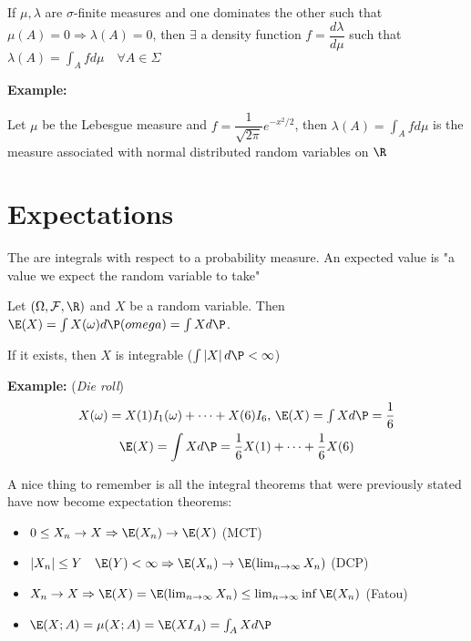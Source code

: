 \par\bigskip
\begin{theo}{}
  If $\mu, \lambda$ are $\sigma$-finite measures and one dominates the other such that $\mu(A) = 0\Rightarrow \lambda(A) =0$, then $\exists$ a density function $f = \dfrac{d\lambda}{d\mu}$ such that $\lambda(A) = \int_A fd\mu\quad \forall A\in\Sigma$
\end{theo}
\par\bigskip
\noindent\textbf{Example:}\par
\noindent Let $\mu$ be the Lebesgue measure and $f = \dfrac{1}{\sqrt{2\pi}}e^{-x^2/2}$, then $\lambda(A) = \int_A fd\mu$ is the measure associated with normal distributed random variables on $\R$
\par\bigskip
\section{Expectations}
\noindent The are integrals with respect to a probability measure. An expected value is "a value we expect the random variable to take"
\par\bigskip
\noindent Let $(\Omega,\mathcal{F},\R)$ and $X$ be a random variable. Then $\E(X)=\int X(\omega)d\P(omega) = \int Xd\P$.\par
\noindent If it exists, then $X$ is integrable ($\int\left|X\right|d\P<\infty$)
\par\bigskip
\noindent\textbf{Example: } (\textit{Die roll})
\begin{equation*}
  \begin{gathered}
    X(\omega) = X(1)I_{1}(\omega)+\cdots+X(6)I_{6}$, $\E(X) = \int Xd\P = \dfrac{1}{6}\\
    \E(X) = \int Xd\P = \dfrac{1}{6}X(1)+\cdots+\dfrac{1}{6}X(6)
  \end{gathered}
\end{equation*}
\par\bigskip
\noindent A nice thing to remember is all the integral theorems that were previously stated have now become expectation theorems:
\begin{itemize}
  \item $0\leq X_n\to X\Rightarrow \E(X_n)\to \E(X)$ (MCT)
  \item $\left|X_n\right|\leq Y\quad \E(Y)<\infty\Rightarrow \E(X_n)\to \E(\lim_{n\to\infty}X_n)$ (DCP)
  \item $X_n\to X\Rightarrow \E(X) = \E(\lim_{n\to\infty}X_n)\leq \lim_{n\to\infty}\inf\E(X_n)$ (Fatou)
  \item $\E(X;A) = \mu(X;A) = \E(XI_A) = \int_A Xd\P$
\end{itemize}
